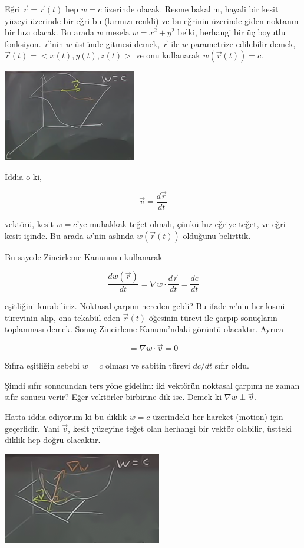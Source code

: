 \documentclass[12pt,fleqn]{article}\usepackage{../../common}
\begin{document}
Eğri $\vec{r} = \vec{r}(t)$ hep $w = c$ üzerinde olacak. Resme bakalım,
hayali bir kesit yüzeyi üzerinde bir eğri bu (kırmızı renkli) ve bu eğrinin
üzerinde giden noktanın bir hızı olacak. Bu arada $w$ mesela $w = x^2 +
y^2$ belki, herhangi bir üç boyutlu fonksiyon. $\vec{r}$'nin $w$ üstünde
gitmesi demek, $\vec{r}$ ile $w$ parametrize edilebilir demek, $\vec{r}(t)
= < x(t),y(t),z(t) >$ ve onu kullanarak $w(\vec{r}(t)) = c$.

\includegraphics[height=4cm]{12_3.png}

İddia o ki, 

$$ \vec{v} = \frac{d\vec{r}}{dt} $$

vektörü, kesit $w = c$'ye muhakkak teğet olmalı, çünkü hız eğriye teğet, ve
eğri kesit içinde. Bu arada $w$'nin aslında $w(\vec{r}(t))$ olduğunu
belirttik.

Bu sayede Zincirleme Kanununu kullanarak 

$$ \frac{dw(\vec{r})}{dt} = \nabla w \cdot \frac{d\vec{r}}{dt} = \frac{dc}{dt}$$

eşitliğini kurabiliriz. Noktasal çarpım nereden geldi? Bu ifade $w$'nin
her kısmi türevinin alıp, ona tekabül eden $\vec{r}(t)$ öğesinin türevi ile
çarpıp sonuçların toplanması demek. Sonuç Zincirleme Kanunu'ndaki görüntü
olacaktır. Ayrıca

$$  = \nabla w \cdot \vec{v} = 0$$

Sıfıra eşitliğin sebebi $w = c$ olması ve sabitin türevi $dc/dt$ sıfır oldu. 

Şimdi sıfır sonucundan ters yöne gidelim: iki vektörün noktasal çarpımı ne zaman
sıfır sonucu verir? Eğer vektörler birbirine dik ise. Demek ki $\nabla w \perp
\vec{v}$.

Hatta iddia ediyorum ki bu diklik $w=c$ üzerindeki her hareket (motion)
için geçerlidir. Yani $\vec{v}$, kesit yüzeyine teğet olan herhangi bir
vektör olabilir, üstteki diklik hep doğru olacaktır.

\includegraphics[height=4cm]{12_4.png}
\end{document}
